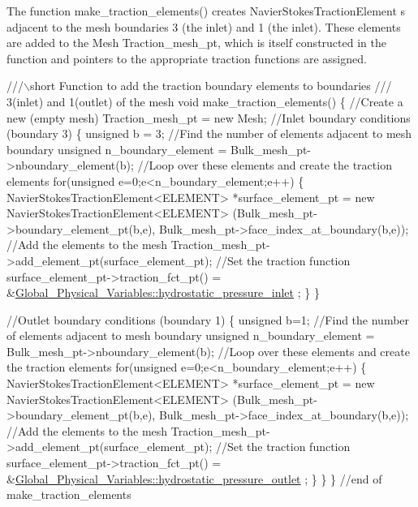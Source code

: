 The function {\ttfamily make\+\_\+traction\+\_\+elements()} creates {\ttfamily Navier\+Stokes\+Traction\+Element} s adjacent to the mesh boundaries 3 (the inlet) and 1 (the inlet). These elements are added to the {\ttfamily Mesh} {\ttfamily Traction\+\_\+mesh\+\_\+pt}, which is itself constructed in the function and pointers to the appropriate traction functions are assigned. 
\begin{DoxyCodeInclude}
 \textcolor{comment}{///\(\backslash\)short Function to add the traction boundary elements to boundaries}
\textcolor{comment}{ /// 3(inlet) and 1(outlet) of the mesh}
\textcolor{comment}{} \textcolor{keywordtype}{void} make\_traction\_elements()
  \{
   \textcolor{comment}{//Create a new (empty mesh)}
   Traction\_mesh\_pt = \textcolor{keyword}{new} Mesh;
   \textcolor{comment}{//Inlet boundary conditions (boundary 3)}
   \{
    \textcolor{keywordtype}{unsigned} b = 3;
    \textcolor{comment}{//Find the number of elements adjacent to mesh boundary}
    \textcolor{keywordtype}{unsigned} n\_boundary\_element = Bulk\_mesh\_pt->nboundary\_element(b);
    \textcolor{comment}{//Loop over these elements and create the traction elements}
    \textcolor{keywordflow}{for}(\textcolor{keywordtype}{unsigned} e=0;e<n\_boundary\_element;e++)
     \{
      NavierStokesTractionElement<ELEMENT> *surface\_element\_pt =
       \textcolor{keyword}{new} NavierStokesTractionElement<ELEMENT>
       (Bulk\_mesh\_pt->boundary\_element\_pt(b,e),
        Bulk\_mesh\_pt->face\_index\_at\_boundary(b,e));
      \textcolor{comment}{//Add the elements to the mesh}
      Traction\_mesh\_pt->add\_element\_pt(surface\_element\_pt);
      \textcolor{comment}{//Set the traction function}
      surface\_element\_pt->traction\_fct\_pt() = 
       &\hyperlink{namespaceGlobal__Physical__Variables_af1f48eb04a3c7f97b1efacea533acdbc}{Global\_Physical\_Variables::hydrostatic\_pressure\_inlet}
      ;
     \}
   \}
   
   \textcolor{comment}{//Outlet boundary conditions (boundary 1)}
   \{
    \textcolor{keywordtype}{unsigned} b=1;
    \textcolor{comment}{//Find the number of elements adjacent to mesh boundary}
    \textcolor{keywordtype}{unsigned} n\_boundary\_element = Bulk\_mesh\_pt->nboundary\_element(b);
    \textcolor{comment}{//Loop over these elements and create the traction elements}
    \textcolor{keywordflow}{for}(\textcolor{keywordtype}{unsigned} e=0;e<n\_boundary\_element;e++)
     \{
      NavierStokesTractionElement<ELEMENT> *surface\_element\_pt =
       \textcolor{keyword}{new} NavierStokesTractionElement<ELEMENT>
       (Bulk\_mesh\_pt->boundary\_element\_pt(b,e),
        Bulk\_mesh\_pt->face\_index\_at\_boundary(b,e));
      \textcolor{comment}{//Add the elements to the mesh}
      Traction\_mesh\_pt->add\_element\_pt(surface\_element\_pt);
      \textcolor{comment}{//Set the traction function}
      surface\_element\_pt->traction\_fct\_pt() = 
       &\hyperlink{namespaceGlobal__Physical__Variables_ab577639e7c51979d3db7565c08c69c70}{Global\_Physical\_Variables::hydrostatic\_pressure\_outlet}
      ;
     \}
   \}
  \} \textcolor{comment}{//end of make\_traction\_elements}

\end{DoxyCodeInclude}


